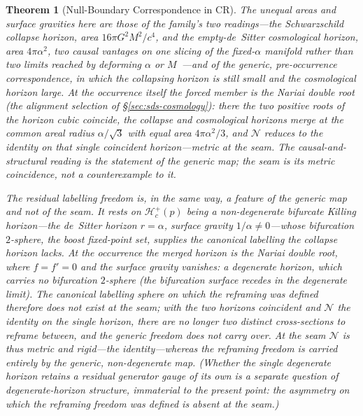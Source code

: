 \documentclass[11pt,a4paper]{article}
\theoremstyle{plain}
\newtheorem{theorem}{Theorem}
\theoremstyle{definition}
\theoremstyle{remark}
\begin{document}
\begin{theorem}[Null-Boundary Correspondence in CR]
The unequal areas and surface gravities here are those of the family's two \emph{readings}---the Schwarzschild collapse horizon, area $16\pi G^2M^2/c^4$, and the empty-de~Sitter cosmological horizon, area $4\pi\alpha^2$, two causal vantages on one slicing of the fixed-$\alpha$ manifold rather than two limits reached by deforming $\alpha$ or $M$~\cite{JanzenSlicing}---and of the generic, pre-occurrence correspondence, in which the collapsing horizon is still small and the cosmological horizon large. At the occurrence itself the forced member is the Nariai double root (the alignment selection of \S\ref{sec:sds-cosmology}): there the two positive roots of the horizon cubic coincide, the collapse and cosmological horizons merge at the common areal radius $\alpha/\sqrt3$ with equal area $4\pi\alpha^2/3$, and $\mathcal{N}$ reduces to the identity on that single coincident horizon---metric at the seam. The causal-and-structural reading is the statement of the generic map; the seam is its metric coincidence, not a counterexample to it.

The residual labelling freedom is, in the same way, a feature of the generic map and not of the seam. It rests on $\mathcal{H}_c^{+}(p)$ being a \emph{non-degenerate} bifurcate Killing horizon---the de~Sitter horizon $r=\alpha$, surface gravity $1/\alpha\neq0$---whose bifurcation $2$-sphere, the boost fixed-point set, supplies the canonical labelling the collapse horizon lacks. At the occurrence the merged horizon is the Nariai double root, where $f=f'=0$ and the surface gravity vanishes: a degenerate horizon, which carries no bifurcation $2$-sphere (the bifurcation surface recedes in the degenerate limit). The canonical labelling sphere on which the reframing was defined therefore does not exist at the seam; with the two horizons coincident and $\mathcal{N}$ the identity on the single horizon, there are no longer two distinct cross-sections to reframe between, and the generic freedom does not carry over. At the seam $\mathcal{N}$ is thus metric \emph{and} rigid---the identity---whereas the reframing freedom is carried entirely by the generic, non-degenerate map. (Whether the single degenerate horizon retains a residual generator gauge of its own is a separate question of degenerate-horizon structure, immaterial to the present point: the asymmetry on which the reframing freedom was defined is absent at the seam.)


\end{theorem}
\end{document}
